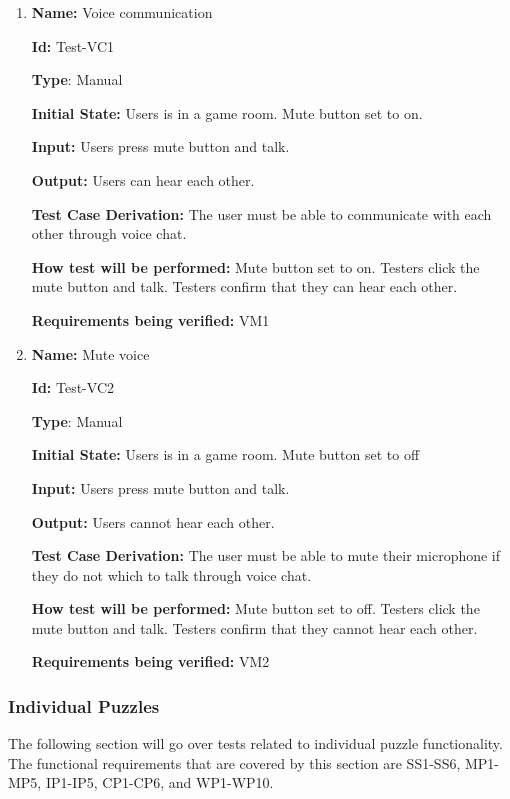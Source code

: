 \documentclass[12pt, titlepage]{article}
\begin{document}
\begin{enumerate}

\item{\textbf{Name:} Voice communication} \label{itm:Test-VC1}

\textbf{Id:} Test-VC1

\textbf{Type}: Manual

\textbf{Initial State:} Users is in a game room. Mute button set to on.

\textbf{Input:} Users press mute button and talk.

\textbf{Output:} Users can hear each other.

\textbf{Test Case Derivation:}
The user must be able to communicate with each other through voice chat.

\textbf{How test will be performed:}
Mute button set to on. Testers click the mute button and talk. Testers confirm that they can hear each other.

\textbf{Requirements being verified: } VM1

\item{\textbf{Name:} Mute voice} \label{itm:Test-VC2}

\textbf{Id:} Test-VC2

\textbf{Type}: Manual

\textbf{Initial State:} Users is in a game room. Mute button set to off

\textbf{Input:} Users press mute button and talk.

\textbf{Output:} Users cannot hear each other.

\textbf{Test Case Derivation:}
The user must be able to mute their microphone if they do not which to talk through voice chat.

\textbf{How test will be performed:}
Mute button set to off. Testers click the mute button and talk. Testers confirm that they cannot hear each other.

\textbf{Requirements being verified: } VM2

\end{enumerate}

\subsubsection{Individual Puzzles}
The following section will go over tests related to individual puzzle functionality. The functional requirements that are covered by this section are SS1-SS6, MP1-MP5, IP1-IP5, CP1-CP6, and WP1-WP10.
\end{document}
